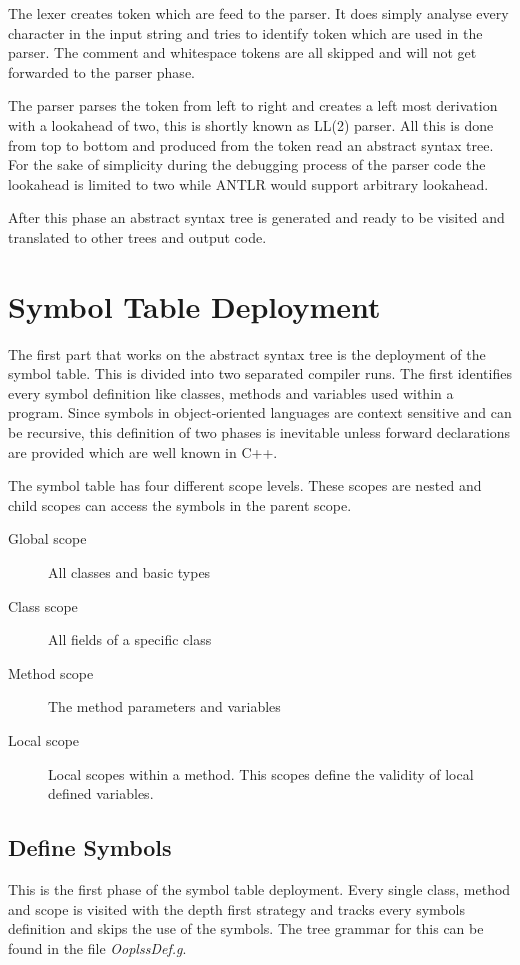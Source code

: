 The lexer creates token which are feed to the parser. It does simply
analyse every character in the input string and tries to identify token
which are used in the parser. The comment and whitespace tokens are all
skipped and will not get forwarded to the parser phase.

The parser parses the token from left to right and creates a left most
derivation with a lookahead of two, this is shortly known as LL(2) parser.
All this is done from top to bottom and produced from the token read an 
abstract syntax tree. For the sake of simplicity during the debugging
process of the parser code the lookahead is limited to two while ANTLR
would support arbitrary lookahead.

After this phase an abstract syntax tree is generated and ready to be visited
and translated to other trees and output code.

\section{Symbol Table Deployment}
The first part that works on the abstract syntax tree is the deployment of
the symbol table. This is divided into two separated compiler runs. The
first identifies every symbol definition like classes, methods and
variables used within a program. Since symbols in object-oriented
languages are context sensitive and can be recursive, this definition
of two phases is inevitable unless forward declarations are provided
which are well known in C++.

The symbol table has four different scope levels. These scopes are nested
and child scopes can access the symbols in the parent scope.
\begin{description}
	\item[Global scope] All classes and basic types
	\item[Class scope] All fields of a specific class
	\item[Method scope] The method parameters and variables
	\item[Local scope] Local scopes within a method. This scopes
	define the validity of local defined variables.
\end{description}

\subsection{Define Symbols}
This is the first phase of the symbol table deployment. Every single
class, method and scope is visited with the depth first strategy and
tracks every symbols definition and skips the use of the symbols. The
tree grammar for this can be found in the file \emph{OoplssDef.g}.

